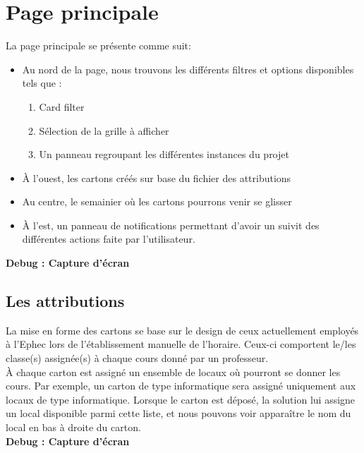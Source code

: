 \section{Page principale}
La page principale se présente comme suit:\\

\begin{itemize}	
	
	\item Au nord de la page, nous trouvons les différents filtres et options disponibles tels que :
	\begin{enumerate}
		\item Card filter
		\item Sélection de la grille à afficher
		\item Un panneau regroupant les différentes instances du projet\\
	\end{enumerate}
	\item À l'ouest, les cartons créés sur base du fichier des attributions\\
	\item Au centre, le semainier où les cartons pourrons venir se glisser\\
	\item À l'est, un panneau de notifications permettant d'avoir un suivit des différentes actions faite par l'utilisateur.
\end{itemize}
\bigskip

\textbf{Debug : Capture d'écran}

\subsection{Les attributions}
La mise en forme des cartons se base sur le design de ceux actuellement employés à l'Ephec lors de l'établissement manuelle de l'horaire. Ceux-ci comportent le/les classe(s) assignée(s) à chaque cours donné par un professeur.\\
\newline
\indent
À chaque carton est assigné un ensemble de locaux où pourront se donner les cours. Par exemple, un carton de type informatique sera assigné uniquement aux locaux de type informatique. Lorsque le carton est déposé, la solution lui assigne un local disponible parmi cette liste, et nous pouvons voir apparaître le nom du local en bas à droite du carton.\\
\newline
\indent
\textbf{Debug : Capture d'écran}

